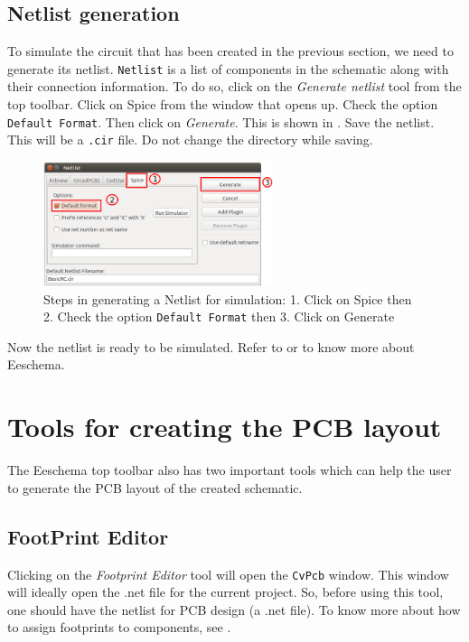 \subsection{Netlist generation}
\label{chap5-netlist-generation}
To simulate the circuit that has been created in the previous section, we
need to generate its netlist. {\tt Netlist} is a list of components in
the schematic along with their connection information. 
To do so, click on the \textit{Generate netlist} tool from the top
toolbar. Click on Spice from the window that opens up. Check the
option {\tt Default Format}. Then click on
\textit{Generate}. This is shown in . Save the
netlist. This will be a {\tt .cir} file. Do not change the directory
while saving. 
\begin{figure}[h]
\centering
\includegraphics[width=0.6\textwidth]{manual_images/netlist.png}
\caption{Steps in generating a Netlist for simulation: 1. Click on Spice then\\
 2. Check the option {\tt Default Format} then 3. Click on Generate}
\label{chap5net}
\end{figure} 
Now the netlist is ready to be simulated. Refer to \cite{kicad} or \cite{kicad2} to know more about Eeschema.

\section {Tools for creating the PCB layout}
The Eeschema top toolbar also has two important tools which can help the user to generate the PCB layout of the created schematic.

\subsection {FootPrint Editor}
Clicking on the \textit{Footprint Editor} tool will open the {\tt CvPcb} 
 window. This window will ideally open the .net file for the 
current project. So, before using this tool, one should have the netlist 
for PCB design (a .net file). To know more about how to assign footprints 
to components, see .


